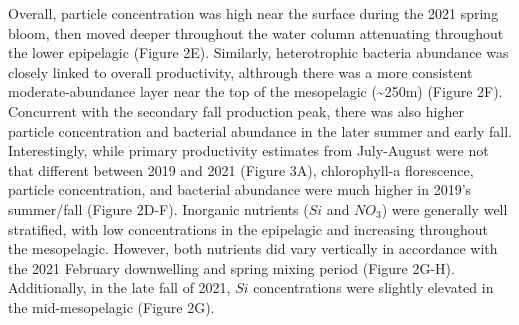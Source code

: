 \documentclass[
]{article}
\begin{document}
Overall, particle concentration was high near the surface during the
2021 spring bloom, then moved deeper throughout the water column
attenuating throughout the lower epipelagic (Figure 2E). Similarly,
heterotrophic bacteria abundance was closely linked to overall
productivity, althrough there was a more consistent moderate-abundance
layer near the top of the mesopelagic (\textasciitilde250m) (Figure 2F).
Concurrent with the secondary fall production peak, there was also
higher particle concentration and bacterial abundance in the later
summer and early fall. Interestingly, while primary productivity
estimates from July-August were not that different between 2019 and 2021
(Figure 3A), chlorophyll-a florescence, particle concentration, and
bacterial abundance were much higher in 2019's summer/fall (Figure
2D-F). Inorganic nutrients (\(Si\) and \(NO_3\)) were generally well
stratified, with low concentrations in the epipelagic and increasing
throughout the mesopelagic. However, both nutrients did vary vertically
in accordance with the 2021 February downwelling and spring mixing
period (Figure 2G-H). Additionally, in the late fall of 2021, \(Si\)
concentrations were slightly elevated in the mid-mesopelagic (Figure
2G).
\end{document}
